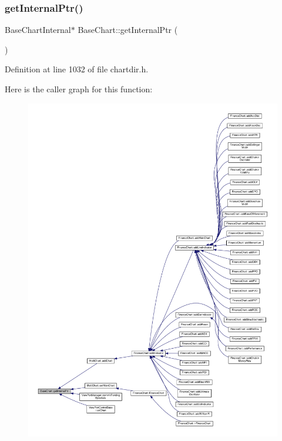 \subsubsection{\texorpdfstring{get\+Internal\+Ptr()}{getInternalPtr()}\hspace{0.1cm}{\footnotesize\ttfamily [1/2]}}
{\footnotesize\ttfamily Base\+Chart\+Internal$\ast$ Base\+Chart\+::get\+Internal\+Ptr (\begin{DoxyParamCaption}{ }\end{DoxyParamCaption})\hspace{0.3cm}{\ttfamily [inline]}}



Definition at line 1032 of file chartdir.\+h.

Here is the caller graph for this function\+:
\nopagebreak
\begin{figure}[H]
\begin{center}
\leavevmode
\includegraphics[width=350pt]{class_base_chart_a5d69ddcea93f12d2a63fbc7d5b640911_icgraph}
\end{center}
\end{figure}
\mbox{\label{class_base_chart_aaea2449d249464b87d3f16a7fb9bd95a}} 
